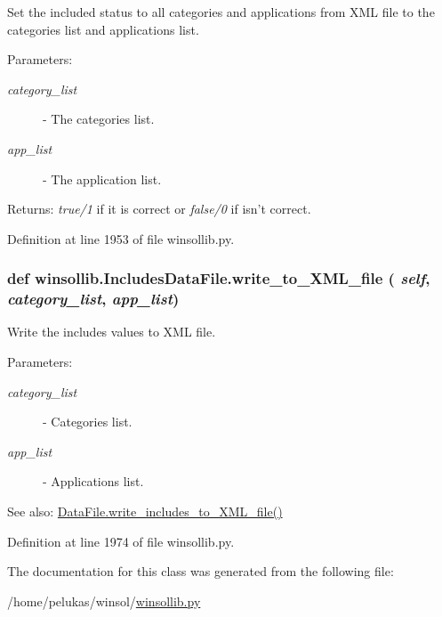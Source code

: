 Set the included status to all categories and applications from XML file to the categories list and applications list. 

\begin{Desc}
\item[Parameters:]
\begin{description}
\item[{\em category\_\-list}]- The categories list. \item[{\em app\_\-list}]- The application list. \end{description}
\end{Desc}
\begin{Desc}
\item[Returns:]{\em true/1\/} if it is correct or {\em false/0\/} if isn't correct. \end{Desc}


Definition at line 1953 of file winsollib.py.\hypertarget{classwinsollib_1_1IncludesDataFile_c00968b80f4b283abebe905f267f07b5}{
\subsubsection[write\_\-to\_\-XML\_\-file]{\setlength{\rightskip}{0pt plus 5cm}def winsollib.Includes\-Data\-File.write\_\-to\_\-XML\_\-file ( {\em self},  {\em category\_\-list},  {\em app\_\-list})}}
\label{classwinsollib_1_1IncludesDataFile_c00968b80f4b283abebe905f267f07b5}


Write the includes values to XML file. 

\begin{Desc}
\item[Parameters:]
\begin{description}
\item[{\em category\_\-list}]- Categories list. \item[{\em app\_\-list}]- Applications list.\end{description}
\end{Desc}
\begin{Desc}
\item[See also:]\hyperlink{classwinsollib_1_1DataFile_76c4b5fd1fac580996b094f31c6f5f7a}{Data\-File.write\_\-includes\_\-to\_\-XML\_\-file()} \end{Desc}


Definition at line 1974 of file winsollib.py.

The documentation for this class was generated from the following file:\begin{CompactItemize}
\item 
/home/pelukas/winsol/\hyperlink{winsollib_8py}{winsollib.py}\end{CompactItemize}
